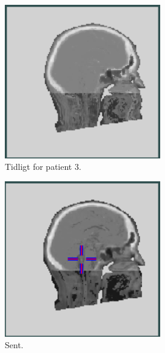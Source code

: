 \begin{figure}
\begin{subfigure}{0.3\textwidth}
        \centering
        \includegraphics[width=0.75\textwidth]{colager/over_tid_sct/over_tid_sct_210445_early.png}
        \caption{Tidligt for patient 3.}
        \label{col:over_time_sct_pat3_early}
    \end{subfigure}\hfill
    \begin{subfigure}{0.3\textwidth}
        \centering
        \includegraphics[width=0.75\textwidth]{colager/over_tid_sct/over_tid_sct_210445_late.png}
        \caption{Sent.}
        \label{col:over_time_sct_pat3_late}
    \end{subfigure}\hfill
    \begin{subfigure}{0.3\textwidth}
        \centering

\end{subfigure}
\end{figure}

